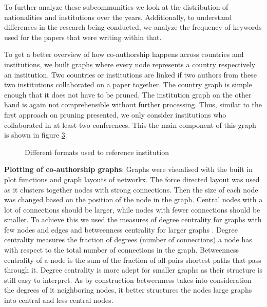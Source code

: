 \documentclass[journal,twocolumn]{IEEEtran}
\begin{document}
    \begin{figure}
        \begin{center}\end{center}
        \caption{}
        \label{}
    \end{figure}
    

    \begin{figure}
        \begin{center}\end{center}
        \caption{}
        \label{}
    \end{figure}
    
    To further analyze these subcommunities we look at the distribution of
nationalities and institutions over the years. Additionally, to
understand differences in the research being conducted, we analyze the
frequency of keywords used for the papers that were writing within that.

To get a better overview of how co-authorship happens across countries
and institutions, we built graphs where every node represents a country
respectively an institution. Two countries or institutions are linked if
two authors from these two institutions collaborated on a paper
together. The country graph is simple enough that it does not have to be
pruned. The institution graph on the other hand is again not
comprehensible without further processing. Thus, similar to the first
approach on pruning presented, we only consider institutions who
collaborated in at least two conferences. This the main component of
this graph is shown in figure \ref{unigraph}.


    \begin{figure}
        \begin{center}\end{center}
        \caption{Different formats used to reference institution}
        \label{unigraph}
    \end{figure}
    
    \textbf{Plotting of co-authorship graphs}: Graphs were visualised with
the built in plot functions and graph layouts of networkx. The force
directed layout was used as it clusters together nodes with strong
connections. Then the size of each node was changed based on the
position of the node in the graph. Central nodes with a lot of
connections should be larger, while nodes with fewer connections should
be smaller. To achieve this we used the measures of degree centrality
for graphs with few nodes and edges and betweenness centrality for
larger graphs . Degree centrality measures the fraction of degrees
(number of connections) a node has with respect to the total number of
connections in the graph. Betweenness centrality of a node is the sum of
the fraction of all-pairs shortest paths that pass through it. Degree
centrality is more adept for smaller graphs as their structure is still
easy to interpret. As by construction betweenness takes into
consideration the degrees of it neighboring nodes, it better structures
the nodes large graphs into central and less central nodes.
\end{document}
